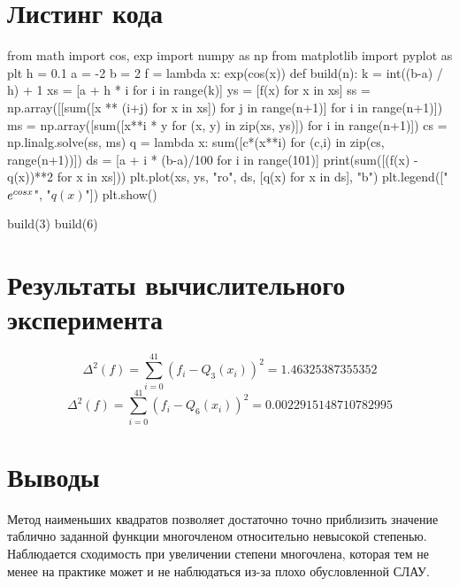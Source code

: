 \documentclass{article}
\begin{document}
\section*{Листинг кода}
\begin{python}
from math import cos, exp
import numpy as np
from matplotlib import pyplot as plt
h = 0.1
a = -2
b =  2
f = lambda x: exp(cos(x))
def build(n):
    k = int((b-a) / h) + 1
    xs = [a + h * i for i in range(k)]
    ys = [f(x) for x in xs]
    ss = np.array([[sum([x ** (i+j) for x in xs]) for j in range(n+1)] for i in range(n+1)])
    ms = np.array([sum([x**i * y for (x, y) in zip(xs, ys)]) for i in range(n+1)])
    cs = np.linalg.solve(ss, ms)
    q = lambda x: sum([c*(x**i) for (c,i) in zip(cs, range(n+1))])
    ds = [a + i * (b-a)/100 for i in range(101)]
    print(sum([(f(x) - q(x))**2 for x in xs]))
    plt.plot(xs, ys, "ro", ds, [q(x) for x in ds], "b")
    plt.legend(["$e^{\\cos x}$", "$q(x)$"])
    plt.show()

build(3)
build(6)
\end{python}
\section*{Результаты вычислительного эксперимента}
\begin{equation*}
   \Delta^2(f) = \sum_{i=0}^{41}(f_i - Q_3(x_i))^2 = 1.46325387355352 
\end{equation*}
\begin{equation*}
   \Delta^2(f) = \sum_{i=0}^{41}(f_i - Q_6(x_i))^2 = 0.0022915148710782995
\end{equation*}
\section*{Выводы}
Метод наименьших квадратов позволяет достаточно точно приблизить значение 
таблично заданной функции многочленом относительно невысокой степенью.
Наблюдается сходимость при увеличении степени многочлена, которая тем не менее 
на практике может и не наблюдаться из-за плохо обусловленной СЛАУ.
\end{document}
